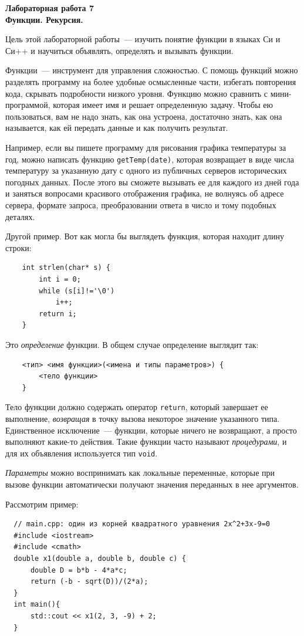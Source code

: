 \documentclass{article}
\begin{document}
\noindent
\textbf{Лабораторная работа 7}\\
{\Large \textbf{Функции. Рекурсия.}}\\
\strut\hfill{}

Цель этой лабораторной работы~--- изучить понятие функции в языках Си и Си++ и научиться объявлять, определять и вызывать функции.

Функции~--- инструмент для управления сложностью. С помощь функций можно разделять программу на более удобные осмысленные части, избегать повторения кода, скрывать подробности низкого уровня. Функцию можно сравнить с мини-программой, которая имеет имя и решает определенную задачу. Чтобы ею пользоваться, вам не надо знать, как она устроена, достаточно знать, как она называется, как ей передать данные и как получить результат.

Например, если вы пишете программу для рисования графика температуры за год, можно написать функцию \texttt{getTemp(date)}, которая возвращает в виде числа температуру за указанную дату с одного из публичных серверов исторических погодных данных. После этого вы сможете вызывать ее для каждого из дней года и заняться вопросами красивого отображения графика, не волнуясь об адресе сервера, формате запроса, преобразовании ответа в число и тому подобных деталях.

Другой пример. Вот как могла бы выглядеть функция, которая находит длину строки:
\begin{verbatim}
    int strlen(char* s) {
        int i = 0;
        while (s[i]!='\0')
            i++;
        return i;
    }
\end{verbatim}
Это \emph{определение} функции. В общем случае определение выглядит так:
\begin{verbatim}
    <тип> <имя функции>(<имена и типы параметров>) {
        <тело функции>
    }
\end{verbatim}
Тело функции должно содержать оператор \texttt{return}, который завершает ее выполнение, \emph{возвращая} в точку вызова некоторое значение указанного типа. Единственное исключение~--- функции, которые ничего не возвращают, а просто выполняют какие-то действия. Такие функции часто называют \emph{процедурами}, и для их объявления используется тип \texttt{void}.

\emph{Параметры} можно воспринимать как локальные переменные, которые при вызове функции автоматически получают значения переданных в нее аргументов.

Рассмотрим пример:
\begin{verbatim}
  // main.cpp: один из корней квадратного уравнения 2x^2+3x-9=0
  #include <iostream>
  #include <cmath>
  double x1(double a, double b, double c) {
      double D = b*b - 4*a*c;
      return (-b - sqrt(D))/(2*a);
  }
  int main(){
      std::cout << x1(2, 3, -9) + 2;
  }
\end{verbatim}
\end{document}
